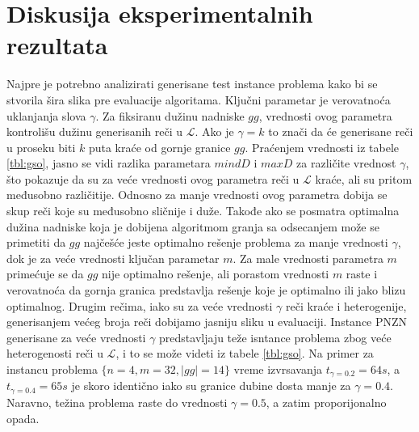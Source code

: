 \documentclass[12pt,oneside]{memoir}
\begin{document}
\chapter{Diskusija eksperimentalnih rezultata}
\label{chap:diskusijaRez}
Najpre je potrebno
analizirati generisane test instance problema kako bi se stvorila šira slika
pre evaluacije algoritama. Ključni parametar
je verovatnoća uklanjanja slova $\gamma$. 
Za fiksiranu dužinu nadniske $gg$, vrednosti ovog parametra
kontrolišu dužinu generisanih reči u $\mathcal{L}$.
Ako je $\gamma=k$ to znači da će generisane reči u proseku
biti $k$ puta kraće od gornje granice $gg$.
Praćenjem vrednosti iz tabele \ref{tbl:gso}, jasno se vidi
razlika parametara $mindD$ i $maxD$ za različite vrednost $\gamma$,
što pokazuje da su za veće vrednosti ovog parametra reči u $\mathcal{L}$ kraće,
ali su pritom međusobno različitije. Odnosno za manje vrednosti
ovog parametra dobija se skup reči koje su međusobno sličnije i duže.
Takođe ako se posmatra optimalna dužina nadniske koja je dobijena algoritmom
granja sa odsecanjem
može se primetiti da $gg$ najčešće jeste 
optimalno rešenje problema za manje vrednosti $\gamma$, dok je za veće 
vrednosti ključan parametar $m$. Za male vrednosti parametra
$m$ primećuje se da $gg$ nije optimalno rešenje,
ali porastom vrednosti $m$ raste i verovatnoća da gornja granica predstavlja
rešenje koje je optimalno ili jako blizu optimalnog.
Drugim rečima, iako su za veće vrednosti $\gamma$ reči kraće i heterogenije,
generisanjem većeg broja reči dobijamo jasniju sliku u evaluaciji.
Instance PNZN generisane za veće vrednosti $\gamma$ predstavljaju
teže isntance problema zbog veće heterogenosti reči u $\mathcal{L}$, i to
se može videti iz tabele \ref{tbl:gso}. Na primer za instancu problema
$\{n=4,m=32,|gg|=14\}$ vreme izvrsavanja $t_{\gamma=0.2}=64s$, a $t_{\gamma=0.4}=65s$
je skoro identično iako su granice dubine dosta manje za $\gamma=0.4$.
Naravno, težina problema raste do vrednosti $\gamma=0.5$, a zatim proporijonalno opada.
\end{document}
